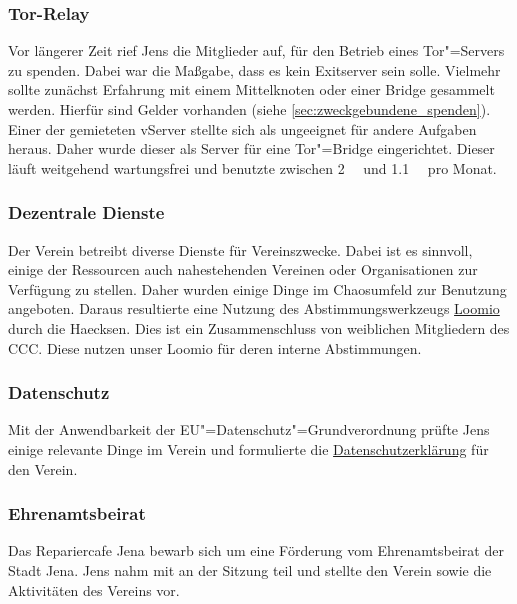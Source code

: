 \documentclass[ngerman]{scrartcl}
\begin{document}
\subsubsection{Tor-Relay}

Vor längerer Zeit rief Jens die Mitglieder auf, für den Betrieb eines
Tor"=Servers zu spenden. Dabei war die Maßgabe, dass es kein Exitserver sein
solle. Vielmehr sollte zunächst Erfahrung mit einem Mittelknoten oder einer
Bridge gesammelt werden. Hierfür sind Gelder vorhanden (siehe
\autoref{sec:zweckgebundene_spenden}). Einer der gemieteten vServer stellte sich
als ungeeignet für andere Aufgaben heraus. Daher wurde dieser als Server für
eine Tor"=Bridge eingerichtet. Dieser läuft weitgehend wartungsfrei und benutzte
zwischen \SI{2}{\gibi\byte} und \SI{1,1}{\tebi\byte} pro Monat.

\subsubsection{Dezentrale Dienste}

Der Verein betreibt diverse Dienste für Vereinszwecke. Dabei ist es sinnvoll,
einige der Ressourcen auch nahestehenden Vereinen oder Organisationen zur
Verfügung zu stellen. Daher wurden einige Dinge im Chaosumfeld zur Benutzung
angeboten. Daraus resultierte eine Nutzung des Abstimmungswerkzeugs
\href{https://loomio.kraut.space/}{Loomio} durch die Haecksen. Dies ist ein
Zusammenschluss von weiblichen Mitgliedern des CCC. Diese nutzen unser Loomio
für deren interne Abstimmungen.

\subsubsection{Datenschutz}

Mit der Anwendbarkeit der EU"=Datenschutz"=Grundverordnung prüfte Jens einige
relevante Dinge im Verein und formulierte die
\href{https://kraut.space/datenschutz}{Datenschutzerklärung} für den Verein.

\subsubsection{Ehrenamtsbeirat}

Das Repariercafe Jena bewarb sich um eine Förderung vom Ehrenamtsbeirat der
Stadt Jena. Jens nahm mit an der Sitzung teil und stellte den Verein sowie die
Aktivitäten des Vereins vor.
\end{document}
